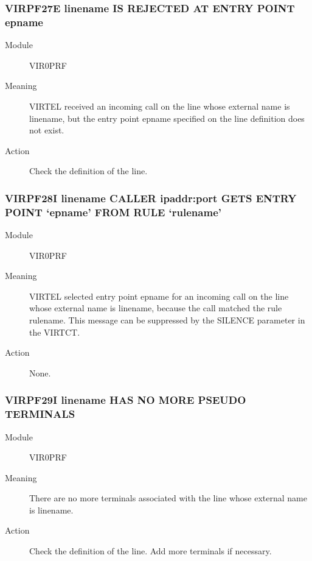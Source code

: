 \documentclass[letterpaper,10pt,english]{sphinxmanual}
\begin{document}
\subsubsection{VIRPF27E linename IS REJECTED AT ENTRY POINT epname}
\label{\detokenize{messages:virpf27e-linename-is-rejected-at-entry-point-epname}}\begin{description}
\item[{Module}] \leavevmode
VIR0PRF

\item[{Meaning}] \leavevmode
VIRTEL received an incoming call on the line whose external name is linename, but the entry point epname specified on the line definition does not exist.

\item[{Action}] \leavevmode
Check the definition of the line.

\end{description}


\subsubsection{VIRPF28I linename CALLER ipaddr:port GETS ENTRY POINT ‘epname’ FROM RULE ‘rulename’}
\label{\detokenize{messages:virpf28i-linename-caller-ipaddr-port-gets-entry-point-epname-from-rule-rulename}}\begin{description}
\item[{Module}] \leavevmode
VIR0PRF

\item[{Meaning}] \leavevmode
VIRTEL selected entry point epname for an incoming call on the line whose external name is linename, because the call matched the rule rulename. This message can be suppressed by the SILENCE parameter in the VIRTCT.

\item[{Action}] \leavevmode
None.

\end{description}


\subsubsection{VIRPF29I linename HAS NO MORE PSEUDO TERMINALS}
\label{\detokenize{messages:virpf29i-linename-has-no-more-pseudo-terminals}}\begin{description}
\item[{Module}] \leavevmode
VIR0PRF

\item[{Meaning}] \leavevmode
There are no more terminals associated with the line whose external name is linename.

\item[{Action}] \leavevmode
Check the definition of the line. Add more terminals if necessary.

\end{description}
\end{document}
